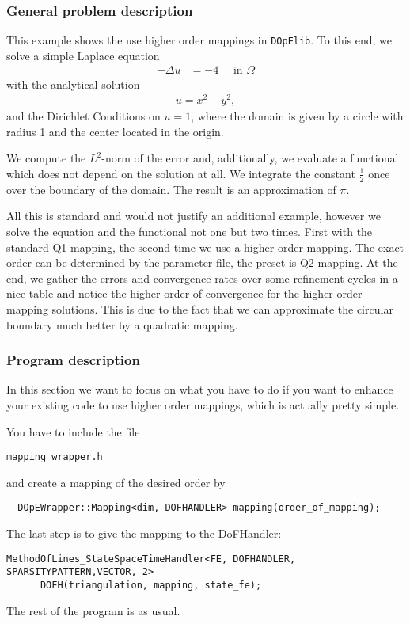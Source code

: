 \subsubsection{General problem description}
This example shows the use higher order mappings in \texttt{DOpElib}. To this end, we solve a simple Laplace equation
\begin{align*}
-\Delta u &= -4 \quad\text{ in } \Omega
\end{align*}
with the analytical solution
\begin{align*}
u = {x^2 + y^2},
\end{align*}
and the Dirichlet Conditions on $u=1$, where the domain is given by a circle with radius 1 and the center located in the origin.

We compute the $L^2$-norm of the error and, additionally, we evaluate a functional which does not depend on the solution at all.
We integrate the constant $\frac 12$ once over the boundary of the domain. The result is an approximation of $\pi$.

All this is standard and would not justify an additional example, however we solve the equation and the functional not one but two
times. First with the standard Q1-mapping, the second time we use a higher order mapping. The exact order can be determined by the 
parameter file, the preset is Q2-mapping. At the end, we gather the errors and convergence rates over some refinement cycles
in a nice table and notice the higher order of convergence for the higher order mapping solutions. This is due to the fact that
we can approximate the circular boundary much better by a quadratic mapping.
\subsubsection{Program description}
In this section we want to focus on what you have to do if you want to enhance your existing code to use higher order mappings,
which is actually pretty simple.

You have to include the file
\begin{verbatim}
mapping_wrapper.h
\end{verbatim}

and create a mapping of the desired order by
\begin{verbatim}
  DOpEWrapper::Mapping<dim, DOFHANDLER> mapping(order_of_mapping);
\end{verbatim}

The last step is to give the mapping to the DoFHandler:
\begin{verbatim}
MethodOfLines_StateSpaceTimeHandler<FE, DOFHANDLER, SPARSITYPATTERN,VECTOR, 2> 
	  DOFH(triangulation, mapping, state_fe);
\end{verbatim}
The rest of the program is as usual.

